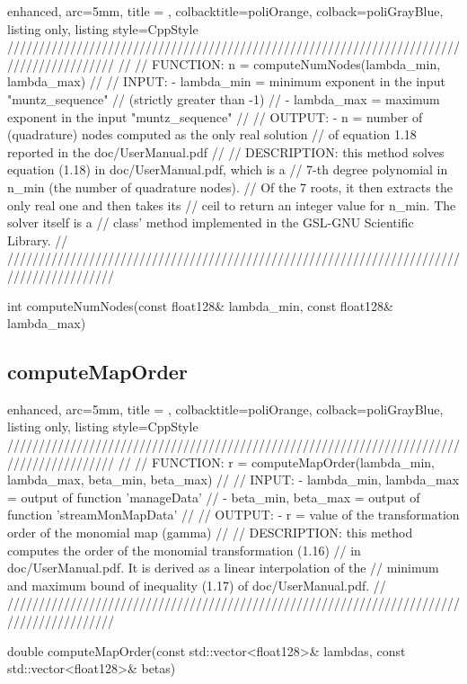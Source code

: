 \documentclass[a4paper, twosided]{book}
\begin{document}
\begin{tcblisting}{enhanced,
                   arc=5mm,
                   title = \color{black}{\large \ttfamily MonMap.cpp/computeNumNodes},
                   colbacktitle=poliOrange,
                   colback=poliGrayBlue,
                   listing only,
                   listing style=CppStyle}
/////////////////////////////////////////////////////////////////////////////////////////
//
//       FUNCTION: n = computeNumNodes(lambda_min, lambda_max)
//                
//          INPUT: - lambda_min = minimum exponent in the input "muntz_sequence" 
//                                (strictly greater than -1)
//                 - lambda_max = maximum exponent in the input "muntz_sequence"
//
//         OUTPUT: - n = number of (quadrature) nodes computed as the only real solution
//                       of equation 1.18 reported in the doc/UserManual.pdf
//
//    DESCRIPTION: this method solves equation (1.18) in doc/UserManual.pdf, which is a 
//                 7-th degree polynomial in n_min (the number of quadrature nodes).
//                 Of the 7 roots, it then extracts the only real one and then takes its
//                 ceil to return an integer value for n_min. The solver itself is a 
//                 class' method implemented in the GSL-GNU Scientific Library.
//
/////////////////////////////////////////////////////////////////////////////////////////

int computeNumNodes(const float128& lambda_min, const float128& lambda_max)
\end{tcblisting}

\newpage
\subsection[computeMapOrder]{\changefont computeMapOrder}\label{SubSec4.1.3}

\begin{tcblisting}{enhanced,
                   arc=5mm,
                   title = \color{black}{\large \ttfamily MonMap.cpp/computeMapOrder},
                   colbacktitle=poliOrange,
                   colback=poliGrayBlue,
                   listing only,
                   listing style=CppStyle}
/////////////////////////////////////////////////////////////////////////////////////////
//
//       FUNCTION: r = computeMapOrder({lambda_min, lambda_max}, {beta_min, beta_max})
//                
//          INPUT: - {lambda_min, lambda_max} = output of function 'manageData'
//                 - {beta_min, beta_max} = output of function 'streamMonMapData'
//
//         OUTPUT: - r = value of the transformation order of the monomial map (gamma)
//
//    DESCRIPTION: this method computes the order of the monomial transformation (1.16)
//                 in doc/UserManual.pdf. It is derived as a linear interpolation of the
//                 minimum and maximum bound of inequality (1.17) of doc/UserManual.pdf.
//
/////////////////////////////////////////////////////////////////////////////////////////

double computeMapOrder(const std::vector<float128>& lambdas, const std::vector<float128>& betas)
\end{tcblisting}
\end{document}
